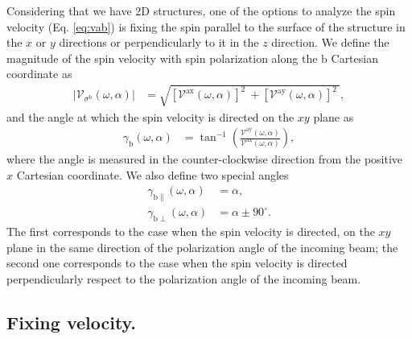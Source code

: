 \documentclass[prb,11pt,tightenlines,twocolumn,aps]{revtex4-1}
\begin{document}
{\color{red} Considering that we have 2D structures, one of the options to
analyze the spin velocity (Eq. \eqref{eq:vab}) is fixing the spin parallel to
the surface of the structure in the $x$ or $y$ directions or perpendicularly to
it in the $z$ direction. We define the magnitude of the spin velocity with spin
polarization along the $\mathrm{b}$ Cartesian coordinate as}
\begin{align}
|\mathcal{V}_{\sigma^{\mathrm{b}}}(\omega,\alpha)| 
&=
\sqrt{
[\mathcal{V}^{\mathrm{ax}}(\omega,\alpha)]^{2}\ +
[\mathcal{V}^{\mathrm{ay}}(\omega,\alpha)]^{2}\ 
}, 
\label{eq:vs-mag}
\end{align}
and the angle at which the spin velocity is directed on the $xy$ plane as
\begin{align}
\gamma_{\mathrm{b}} (\omega,\alpha)
&=
\tan^{-1} \left( \frac{\mathcal{V}^{\mathrm{ay}}(\omega,\alpha)}
{\mathcal{V}^{\mathrm{ax}}(\omega,\alpha)} \right),
\label{eq:gamma-ang}
\end{align}
where the angle is measured in the counter-clockwise direction from the
positive $x$ Cartesian coordinate. {\color{red} We also define two special
angles
\begin{align}
\gamma_{\mathrm{b \parallel}}(\omega,\alpha) &= \alpha, 
\label{eq:gamma-par} 
\\
\gamma_{\mathrm{b \perp}}(\omega,\alpha) &= \alpha \pm 90^{\circ}.
\label{eq:gamma-perp}
\end{align}
The first corresponds to the case when the spin velocity is directed, on the
$xy$ plane in the same direction of the polarization angle of the incoming
beam; the second one corresponds to the case when the spin velocity is directed
perpendicularly respect to the polarization angle of the incoming beam. }



\subsection{Fixing velocity.}\label{sec:theory-fixvel}
\end{document}
